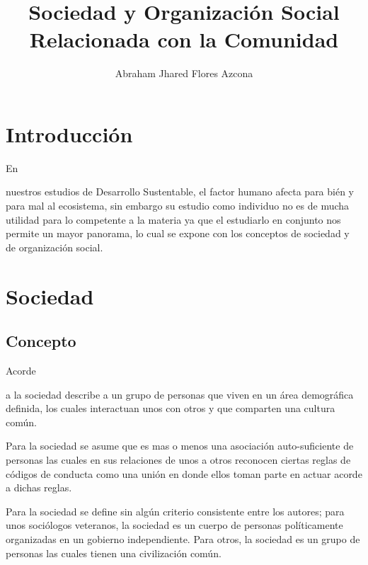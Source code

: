 \documentclass[stu, 12pt, letterpaper, donotrepeattitle, floatsintext, natbib]{apa7}
\title{\Large Sociedad y Organización Social Relacionada con la Comunidad}
\author{Abraham Jhared Flores Azcona} %
\affiliation{Instituto Tecnológico de Tijuana}
\begin{document}
\maketitle


\renewcommand\contentsname{Contenido}
\tableofcontents

\newpage
\section*{Introducción}
En \begin{justifying}
    nuestros estudios de Desarrollo Sustentable, el factor humano afecta para bién y para mal al ecosistema, sin embargo su estudio como individuo
    no es de mucha utilidad para lo competente a la materia ya que el estudiarlo en conjunto nos permite un mayor panorama, lo cual se expone con los conceptos
    de sociedad y de organización social.\par
\end{justifying}
\vspace{\baselineskip}
\section{Sociedad}
\subsection{Concepto}
Acorde \begin{justifying} 
    a \cite{lumen-learning-no-date}
    la sociedad describe a un grupo de personas que viven en un área demográfica definida,
    los cuales interactuan unos con otros y que comparten una cultura común.\par
    Para \cite{copp-1992} %
    la sociedad se asume que es mas o menos una asociación auto-suficiente de personas las cuales
    en sus relaciones de unos a otros reconocen ciertas reglas de códigos de conducta
    como una unión en donde ellos toman parte en actuar acorde a dichas reglas.\par
    Para \cite{ellwood-1907} %
    la sociedad se define sin algún criterio consistente entre los autores; para unos sociólogos
    veteranos, la sociedad es un cuerpo de personas políticamente organizadas en un gobierno independiente. 
    Para otros, la sociedad es un grupo de personas las cuales tienen una civilización común.\par
\end{justifying}        
\vspace{\baselineskip}
\end{document}
